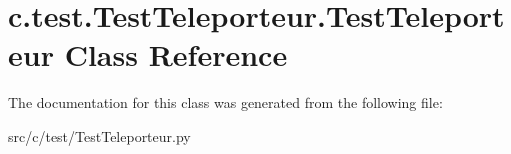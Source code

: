 \hypertarget{classc_1_1test_1_1_test_teleporteur_1_1_test_teleporteur}{}\section{c.\+test.\+Test\+Teleporteur.\+Test\+Teleporteur Class Reference}
\label{classc_1_1test_1_1_test_teleporteur_1_1_test_teleporteur}


The documentation for this class was generated from the following file\+:\begin{DoxyCompactItemize}
\item 
src/c/test/Test\+Teleporteur.\+py\end{DoxyCompactItemize}
